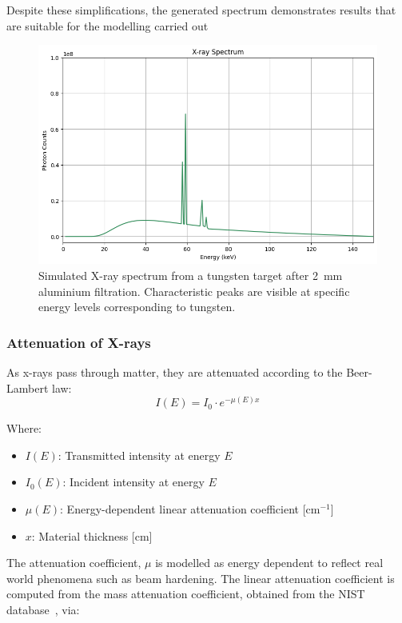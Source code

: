 \documentclass{article}
\theoremstyle{definition}
\begin{document}
Despite these simplifications, the generated spectrum demonstrates results that are suitable for the modelling carried out

\begin{figure}
	\includegraphics[scale=0.6]{typicalxrayspectra.png}
	\caption{Simulated X-ray spectrum from a tungsten target after 2~mm aluminium filtration. Characteristic peaks are visible at specific energy levels corresponding to tungsten.}
  \label{fig:basespectra}
\end{figure}

\subsubsection{Attenuation of X-rays}
As x-rays pass through matter, they are attenuated according to the Beer-Lambert law: 
\begin{equation} \label{bl}
I(E) = I_0 \cdot e^{-\mu(E) x}
\end{equation}

Where:
\begin{itemize}
  \item $I(E)$: Transmitted intensity at energy $E$
  \item $I_0(E)$: Incident intensity at energy $E$
  \item $\mu(E)$: Energy-dependent linear attenuation coefficient [cm$^{-1}$]
  \item $x$: Material thickness [cm]

\end{itemize}

The attenuation coefficient, $\mu$ is modelled as energy dependent to reflect real world phenomena such as beam hardening. The linear attenuation coefficient is computed from the mass attenuation coefficient, obtained from the NIST database~\cite{NISTXRay}, via:
\end{document}
